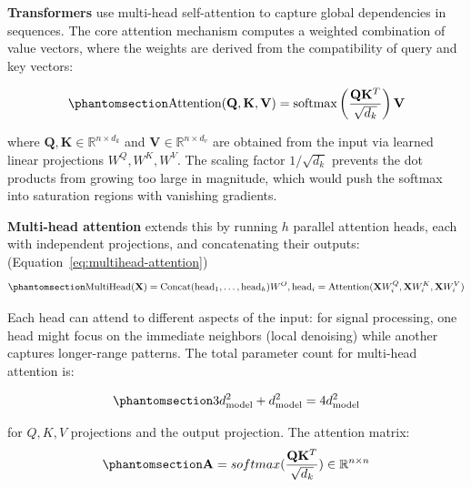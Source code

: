 \textbf{Transformers} \cite{Vaswani2017Attention} use multi-head self-attention to capture global dependencies in sequences. The core attention mechanism computes a weighted combination of value vectors, where the weights are derived from the compatibility of query and key vectors:

\begin{equation}\protect\phantomsection\label{eq:attention}{\text{Attention}(\mathbf{Q}, \mathbf{K}, \mathbf{V}) = \text{softmax}\left(\frac{\mathbf{Q}\mathbf{K}^T}{\sqrt{d_k}}\right)\mathbf{V}
}\end{equation}

where \(\mathbf{Q}, \mathbf{K} \in \mathbb{R}^{n \times d_k}\) and \(\mathbf{V} \in \mathbb{R}^{n \times d_v}\) are obtained from the input via learned linear projections \(W^Q, W^K, W^V\). The scaling factor \(1/\sqrt{d_k}\) prevents the dot products from growing too large in magnitude, which would push the softmax into saturation regions with vanishing gradients.

\textbf{Multi-head attention} extends this by running \(h\) parallel attention heads, each with independent projections, and concatenating their outputs: (Equation~\ref{eq:multihead-attention})
\begin{equation}\protect\phantomsection\label{eq:multihead-attention}{\text{MultiHead}(\mathbf{X}) = \text{Concat}(\text{head}_1, \dots, \text{head}_h) W^O,\\
\text{head}_i = \text{Attention}(\mathbf{X} W_i^Q, \mathbf{X} W_i^K, \mathbf{X} W_i^V)
}\end{equation}

Each head can attend to different aspects of the input: for signal processing, one head might focus on the immediate neighbors (local denoising) while another captures longer-range patterns. The total parameter count for multi-head attention is:

\begin{equation}\protect\phantomsection\label{eq:multihead-attention-parameters-count}{3 d_{\text{model}}^2 + d_{\text{model}}^2 = 4 d_{\text{model}}^2}
\end{equation}

for \(Q, K, V\) projections and the output projection. The attention matrix:
\begin{equation}\protect\phantomsection\label{eq:multihead-attention-matrix}{\mathbf{A} = {softmax({\frac{\mathbf{Q}\mathbf{K}^T}{\sqrt{d_k}}})} \in \mathbb{R}^{n \times n}}
\end{equation}

